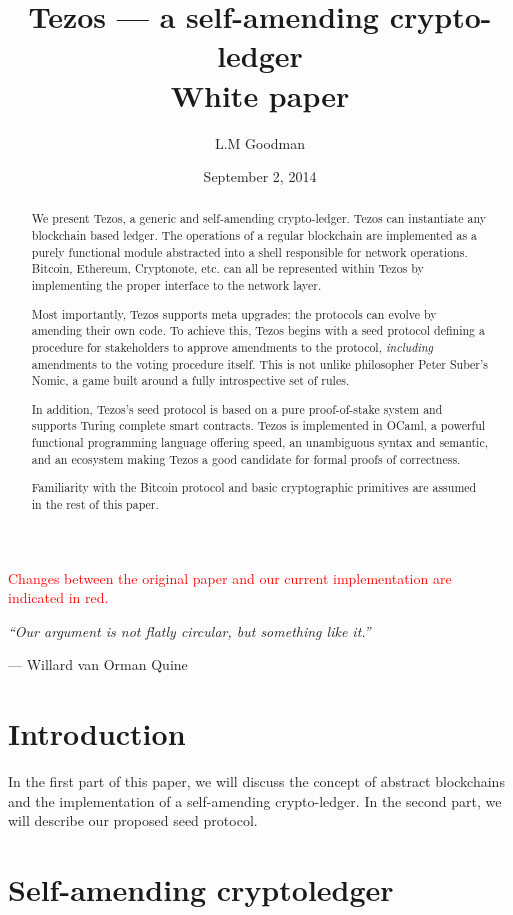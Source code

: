 \documentclass[letterpaper]{article}
\author{L.M Goodman}
\date{September 2, 2014}
\title{Tezos --- a self-amending crypto-ledger \\ White paper}
\newcommand\change[1]{\textcolor{red}{#1}}
\begin{document}
\maketitle


\change{Changes between the original paper and our current implementation are indicated in red.}

\epigraph{\emph{``Our argument is not flatly circular,
but something like it.''}}
{--- \textup{Willard van Orman Quine}}


\begin{abstract}
We present Tezos, a generic and self-amending crypto-ledger. Tezos can
instantiate any blockchain based ledger. The operations of a regular blockchain
are implemented as a purely functional module abstracted into a shell
responsible for network operations. Bitcoin, Ethereum, Cryptonote, etc. can all
be represented within Tezos by implementing the proper interface to the network
layer.

Most importantly, Tezos supports meta upgrades: the protocols can evolve by
amending their own code. To achieve this, Tezos begins with a seed protocol
defining a procedure for stakeholders to approve amendments to the protocol,
\emph{including} amendments to the voting procedure itself. This is not unlike
philosopher Peter Suber's Nomic\cite{Nomic}, a game built around a fully
introspective set of rules.

In addition, Tezos's seed protocol is based on a pure proof-of-stake system
and supports Turing complete smart contracts. Tezos is implemented in OCaml,
a powerful functional programming language offering speed, an unambiguous
syntax and semantic, and an ecosystem making Tezos a good candidate for formal
proofs of correctness.

Familiarity with the Bitcoin protocol and basic cryptographic primitives are
assumed in the rest of this paper.

\end{abstract}
\newpage

\tableofcontents
\newpage

\section{Introduction}
In the first part of this paper, we will discuss the concept of abstract
blockchains and the implementation of a self-amending crypto-ledger.
In the second part, we will describe our proposed seed protocol.

\section{Self-amending cryptoledger}
\end{document}
